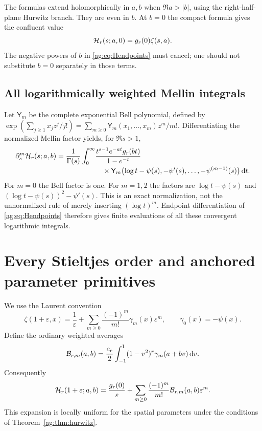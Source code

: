 \documentclass[11pt,letterpaper]{article}
\numberwithin{equation}{section}
\theoremstyle{definition}\newtheorem{definition}[theorem]{Definition}
\theoremstyle{remark}\newtheorem{remark}[theorem]{Remark}
\newcommand{\dd}{\,\mathrm d}\newcommand{\ii}{\mathrm i}
\begin{document}
The formulas extend holomorphically in $a,b$ when $\Re a>|b|$, using
the right-half-plane Hurwitz branch. They are even in $b$. At $b=0$
the compact formula gives the confluent value
\begin{equation}\label{ag:eq:Hcollision}
 \mathcal H_r(s;a,0)=g_r(0)\zeta(s,a).
\end{equation}
The negative powers of $b$ in \eqref{ag:eq:Hendpoints} must cancel;
one should not substitute $b=0$ separately in those terms.

\subsection{All logarithmically weighted Mellin integrals}
Let $\mathsf Y_m$ be the complete exponential Bell polynomial, defined
by $\exp(\sum_{j\ge1}x_jz^j/j!)=\sum_{m\ge0}\mathsf Y_m(x_1,\ldots,x_m)z^m/m!$.
Differentiating the normalized Mellin factor yields, for $\Re s>1$,
\begin{align}
 \partial_s^m\HH_r(s;a,b)
 =\frac1{\Gamma(s)}\int_0^\infty&
 \frac{t^{s-1}e^{-at}g_r(bt)}{1-e^{-t}}\notag\\[-2pt]
 &\quad\times\mathsf Y_m\bigl(\log t-\psi(s),-\psi'(s),
                      \ldots,-\psi^{(m-1)}(s)\bigr)\dd t.
 \label{ag:eq:log-Mellin}
\end{align}
For $m=0$ the Bell factor is one. For $m=1,2$ the factors are
$\log t-\psi(s)$ and $(\log t-\psi(s))^2-\psi'(s)$.
This is an exact normalization, not the unnormalized rule of merely
inserting $(\log t)^m$. Endpoint differentiation of
\eqref{ag:eq:Hendpoints} therefore gives finite evaluations of all
these convergent logarithmic integrals.



\section{Every Stieltjes order and anchored parameter primitives}
\label{ag:sec:stieltjes}

We use the Laurent convention
\begin{equation}\label{ag:eq:Stieltjes-convention}
 \zeta(1+\varepsilon,x)=\frac1\varepsilon+
       \sum_{m\ge0}\frac{(-1)^m}{m!}\gamma_m(x)\varepsilon^m,
                 \qquad \gamma_0(x)=-\psi(x).
\end{equation}
Define the ordinary weighted averages
\begin{equation}\label{ag:eq:Bdefinition}
 \BB_{r,m}(a,b)=\frac{c_r}{2}\int_{-1}^1
                      (1-v^2)^r\gamma_m(a+bv)\dd v.
\end{equation}
Consequently
\[
 \mathcal H_r(1+\varepsilon;a,b)=\frac{g_r(0)}\varepsilon+
              \sum_{m\ge0}\frac{(-1)^m}{m!}\mathcal B_{r,m}(a,b)\varepsilon^m.
\]
This expansion is locally uniform for the spatial parameters under the
conditions of Theorem~\ref{ag:thm:hurwitz}.
\end{document}
